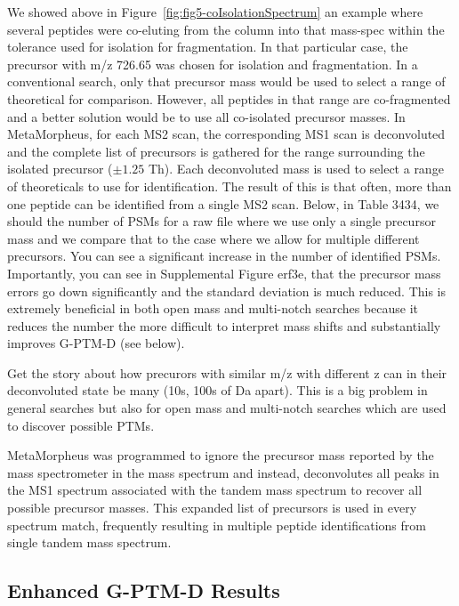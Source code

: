 \documentclass[journal=jprobs,manuscript=article]{achemso}
\begin{document}
We showed above in Figure~\ref{fig:fig5-coIsolationSpectrum} an example where several peptides were co-eluting from the column into that mass-spec within the tolerance used for isolation for fragmentation.
In that particular case, the precursor with m/z 726.65 was chosen for isolation and fragmentation.
In a conventional search, only that precursor mass would be used to select a range of theoretical for comparison.
However, all peptides in that range are co-fragmented and a better solution would be to use all co-isolated precursor masses.
In MetaMorpheus, for each MS2 scan, the corresponding MS1 scan is deconvoluted and the complete list of precursors is gathered for the range surrounding the isolated precursor ($\pm 1.25$ Th).
Each deconvoluted mass is used to select a range of theoreticals to use for identification.
The result of this is that often, more than one peptide can be identified from a single MS2 scan.
Below, in Table 3434, we should the number of PSMs for a raw file where we use only a single precursor mass and we compare that to the case where we allow for multiple different precursors.
You can see a significant increase in the number of identified PSMs.
Importantly, you can see in Supplemental Figure erf3e, that the precursor mass errors go down significantly and the standard deviation is much reduced.
This is extremely beneficial in both open mass and multi-notch searches because it reduces the number the more difficult to interpret mass shifts and substantially improves G-PTM-D (see below).

Get the story about how precurors with similar m/z with different z can in their deconvoluted state be many (10s, 100s of Da apart).
This is a big problem in general searches but also for open mass and multi-notch searches which are used to discover possible PTMs.

MetaMorpheus was programmed to ignore the precursor mass reported by the mass spectrometer in the mass spectrum and instead, deconvolutes all peaks in the MS1 spectrum associated with the tandem mass spectrum to recover all possible precursor masses.
This expanded list of precursors is used in every spectrum match, frequently resulting in multiple peptide identifications from single tandem mass spectrum.

\subsection{Enhanced G-PTM-D Results}
\end{document}
